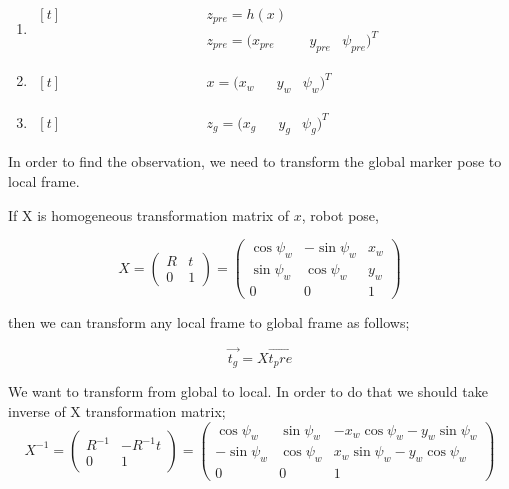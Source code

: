\documentclass[14pt,a4paper]{article}
\begin{document}
		\begin{enumerate}
		\item $\begin{aligned}[t]
		    &&&&&&&&&&&&& z_{pre}=h(x) \\
		    &&&&&&&&&&&&& z_{pre} = (x_{pre}&&y_{pre}&\psi_{pre})^T
		\end{aligned}$
		\item $\begin{aligned}[t]
		    &&&&&&&&&&&&& x = (x_{w}&&y_{w}&\psi_{w})^T
		\end{aligned}$
		\item $\begin{aligned}[t]
		    &&&&&&&&&&&&& z_{g} = (x_{g}&&y_{g}&\psi_{g})^T
		\end{aligned}$
		\end{enumerate}
	
		In order to find the observation, we need to transform the global marker pose to local frame.
		
		If X is homogeneous transformation matrix of $x$, robot pose,
		
		$$	X =	\begin{pmatrix} 
					R & t \\
					0 & 1 
				\end{pmatrix}
			=	\begin{pmatrix}
					\cos\psi_{w}	 &	-\sin\psi_{w} & x_{w}\\	
					\sin\psi_{w} &	\cos\psi_{w}	 & y_{w}\\
					0		 &		0	&	1
				\end{pmatrix}
		$$	
		
		then we can transform any local frame to global frame as follows;
		
				\[\vec{t_g}= X \vec{t_pre} \]
				
		We want to transform from global to local. In order to do that we should take inverse of X transformation matrix;
		$$	X^{-1} =	\begin{pmatrix} 
		
					R^{-1} & -R^{-1}t \\
					0 & 1 
				\end{pmatrix}
			=	\begin{pmatrix}
					\cos\psi_{w}	 &	\sin\psi_{w} & -x_{w}\cos\psi_{w}-y_{w}\sin\psi_{w}\\	
					-\sin\psi_{w} &	\cos\psi_{w}	 &  x_{w}\sin\psi_{w}-y_{w}\cos\psi_{w}\\
					0		 &		0	&	1
				\end{pmatrix}
		$$
		
\end{document}
